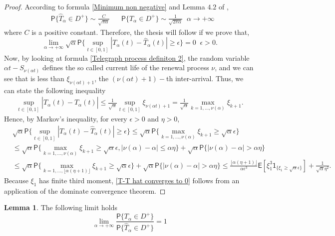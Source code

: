 \documentclass{article}
\theoremstyle{definition}
\newtheorem{lemma}{Lemma}[section]
\numberwithin{equation}{section}
\begin{document}
\begin{proof}
According to formula \eqref{Minimum non negative} and Lemma $4.2$ of \cite{I 1974},
\begin{align*}
&\mathsf{P}\{\hat{T}_{\alpha} \in D^+\} \sim \frac{C}{\sqrt{\pi\alpha}} \;\;\;\;\;\; \mathsf{P}\{{T}_{\alpha} \in D^+\} \sim \frac{1}{\sqrt{2\pi\alpha}} \;\; \alpha \to +\infty
\end{align*}
where $C$ is a positive constant. Therefore, the thesis will follow if we prove that, 
\begin{equation}\label{T-T hat converges to 0}
\lim_{\alpha \to +\infty}\sqrt{\alpha}\mathsf{P}\{\sup_{t \in [0,1]}|T_\alpha(t)-\hat{T}_\alpha(t)|\geq \epsilon\} = 0 \;\; \epsilon>0.
\end{equation}
Now, by looking at formula \eqref{Telegraph process definiton 2}, the random variable $\alpha t- S_{\nu(\alpha t)}$ defines the so called current life of the renewal process $\nu$, and we can see that is less than $\xi_{\nu(\alpha t)+1}$, the $(\nu(\alpha t)+1)-$th inter-arrival. Thus, we can state the following inequality
\begin{align}\label{current life}
\sup_{t \in [0,1]}|T_\alpha(t)-\hat{T}_\alpha(t)|\leq \frac{1}{\sqrt{\alpha}}\sup_{t \in [0,1]}\xi_{\nu(\alpha t)+1} = \frac{1}{\sqrt{\alpha}}\max_{k=1,...,\nu(\alpha)}\xi_{k+1}.
\end{align}
Hence, by Markov's inequality, for every $\epsilon>0$ and $\eta>0$,
\begin{align*}
&\sqrt{\alpha}\mathsf{P}\{\sup_{t \in [0,1]}|T_\alpha(t)-\hat{T}_\alpha(t)|\geq \epsilon\} \leq \sqrt{\alpha}\mathsf{P}\{\max_{k=1,...,\nu(\alpha)}\xi_{k+1}\geq \sqrt{\alpha}\epsilon\} \\
&\leq \sqrt{\alpha}\mathsf{P}\{\max_{k=1,...,\nu(\alpha)}\xi_{k+1}\geq \sqrt{\alpha}\epsilon, |\nu(\alpha) -\alpha| \leq\alpha\eta\}+\sqrt{\alpha}\mathsf{P}\{|\nu(\alpha) -\alpha| >\alpha\eta\}\\
&\leq \sqrt{\alpha}\mathsf{P}\{\max_{k=1,...,\lfloor\alpha (\eta+1)\rfloor}\xi_{k+1}\geq \sqrt{\alpha}\epsilon\}+\sqrt{\alpha}\mathsf{P}\{|\nu(\alpha) -\alpha| >\alpha\eta\} \leq \frac{\lfloor\alpha (\eta+1)\rfloor}{\alpha\epsilon^3}\mathsf{E}[\xi_{1}^{3}\mathsf{1}_{\{\xi_{1}\geq \sqrt{\alpha}\epsilon\}}] + \frac{1}{\sqrt{\alpha}\eta^2}.
\end{align*}
Because $\xi_{1}$ has finite third moment, \eqref{T-T hat converges to 0} follows from an application of the dominate convergence theorem.
\end{proof}
\begin{lemma}\label{Lemma 2 weak convergence}
The following limit holds
\begin{equation}
\lim_{\alpha \to +\infty}\frac{\mathsf{P}\{T_\alpha \in D^+\}}{\mathsf{P}\{\hat{T}_\alpha \in D^+\}} = 1
\end{equation}
\end{lemma}
\end{document}
